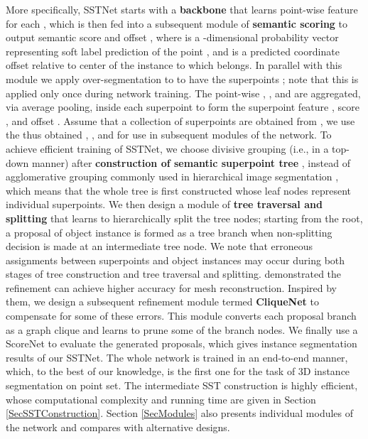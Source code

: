 \documentclass[10pt,twocolumn,letterpaper]{article}
\begin{document}
\vspace{-0.2cm}
More specifically, SSTNet starts with a \textbf{backbone} that learns point-wise feature  for each , which is then fed into a subsequent module of \textbf{semantic scoring} to output semantic score  and offset , where  is a -dimensional probability vector representing soft label prediction of the point , and  is a predicted coordinate offset relative to center of the instance to which  belongs. In parallel with this module we apply over-segmentation to  to have the superpoints ; note that this is applied only once during network training. The point-wise , , and  are aggregated, via average pooling, inside each superpoint to form the superpoint feature , score , and offset . Assume that a collection of superpoints are obtained from , we use the thus obtained , , and  for use in subsequent modules of the network. To achieve efficient training of SSTNet, we choose divisive grouping (i.e., in a top-down manner) after \textbf{construction of semantic superpoint tree }, instead of agglomerative grouping commonly used in hierarchical image segmentation \cite{Ren_2013_CVPR, 2019Hierarchical}, which means that the whole tree  is first constructed whose leaf nodes represent individual superpoints. We then design a module of \textbf{tree traversal and splitting} that learns to hierarchically split the tree nodes; starting from the root, a proposal of object instance is formed as a tree branch when non-splitting decision is made at an intermediate tree node. We note that erroneous assignments between superpoints and object instances may occur during both stages of tree construction and tree traversal and splitting. \cite{pan2019deep, Nie_2020_CVPR} demonstrated the refinement can achieve higher accuracy for mesh reconstruction. Inspired by them, we design a subsequent refinement module termed \textbf{CliqueNet} to compensate for some of these errors. This module converts each proposal branch as a graph clique and learns to prune some of the branch nodes.
We finally use a ScoreNet \cite{jiang2020pointgroup} to evaluate the generated proposals, which gives instance segmentation results of our SSTNet. The whole network is trained in an end-to-end manner, which, to the best of our knowledge, is the first one for the task of 3D instance segmentation on point set. The intermediate SST construction is highly efficient, whose computational complexity and running time are given in Section \ref{SecSSTConstruction}. Section \ref{SecModules} also presents individual modules of the network and compares with alternative designs.
\end{document}
